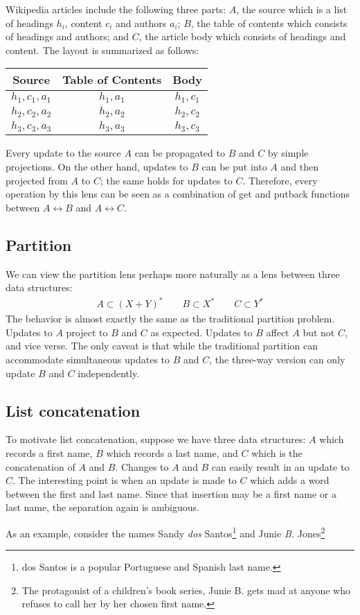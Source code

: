 \documentclass{article}
\begin{document}
Wikipedia articles include the following three parts: $A$, the source which is
a list of headings $h_i$, content $c_i$ and authors $a_i$; $B$, the table of
contents which consists of headings and authors; and $C$, the article body
which consists of headings and content. The layout is summarized as follows:
\begin{center} \begin{tabular}{c c c}
    Source & Table of Contents & Body \\
    \hline
    $h_1,c_1,a_1$ & $h_1,a_1$ & $h_1,c_1$ \\
    $h_2,c_2,a_2$ & $h_2,a_2$ & $h_2,c_2$ \\
    $h_3,c_3,a_3$ & $h_3,a_3$ & $h_3,c_3$ 
\end{tabular} \end{center}
Every update to the source $A$ can be propagated to $B$ and $C$ by
simple projections. On the other hand, updates to $B$ can be
put into $A$ and then projected from $A$ to $C$; the same holds
for updates to $C$. Therefore, every operation by this lens
can be seen as a combination of get and putback functions 
between $A \leftrightarrow B$ and $A \leftrightarrow C$. 

\subsection*{Partition}

We can view the partition lens perhaps more naturally as a lens
between three data structures: 
\begin{align*}
  A \subset (X + Y)^\ast \qquad B \subset X^\ast \qquad C \subset Y^\ast
\end{align*}
The behavior is almost exactly the same as the traditional partition
problem. Updates to $A$ project to $B$ and $C$ as expected. Updates to
$B$ affect $A$ but not $C$, and vice verse. The only caveat is
that while the traditional partition can accommodate simultaneous
updates to $B$ and $C$, the three-way version can only update
$B$ and $C$ independently. 

\subsection*{List concatenation} 

To motivate list concatenation, suppose we have three data structures:
$A$ which records a first name, $B$ which records a last name, and
$C$ which is the concatenation of $A$ and $B$. Changes to $A$ and $B$
can easily result in an update to $C$. The interesting point is when
an update is made to $C$ which adds a word between the first and
last name. Since that insertion may be a first name or a last name,
the separation again is ambiguous. 

As an example, consider the names Sandy \emph{dos} Santos\footnote{dos Santos
is a popular Portuguese and Spanish last name.}
and Junie \emph{B.} Jones\footnote{The protagonist of a children's
book series, Junie B. gets mad at anyone who refuses to call her by her chosen
first name.}
\end{document}
